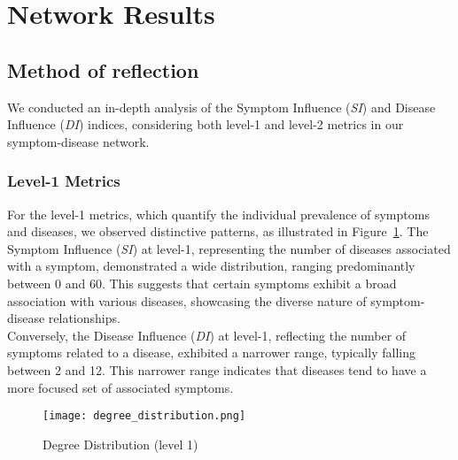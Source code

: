 \section{Network Results}
\label{sec:results_network}
\subsection{Method of reflection}

We conducted an in-depth analysis of the Symptom Influence (\textit{SI}) and Disease Influence (\textit{DI}) indices,
considering both level-1 and level-2 metrics in our symptom-disease network.

\subsubsection*{Level-1 Metrics}
\label{subsubsec:level_1_metrics}

For the level-1 metrics, which quantify the individual prevalence of symptoms and diseases,
we observed distinctive patterns, as illustrated in Figure~\ref{fig:DegreeDistribution}.
The Symptom Influence (\textit{SI}) at level-1, representing the number of diseases associated with a symptom, demonstrated a wide distribution,
ranging predominantly between 0 and 60. This suggests that certain symptoms exhibit a broad association with various diseases,
showcasing the diverse nature of symptom-disease relationships.\\
Conversely, the Disease Influence (\textit{DI}) at level-1, reflecting the number of symptoms related to a disease,
exhibited a narrower range, typically falling between 2 and 12.
This narrower range indicates that diseases tend to have a more focused set of associated symptoms.
\begin{figure}[H]
    \centering
    \texttt{[image: degree\_distribution.png]}
    \caption{Degree Distribution (level 1)}\label{fig:DegreeDistribution}
\end{figure}

